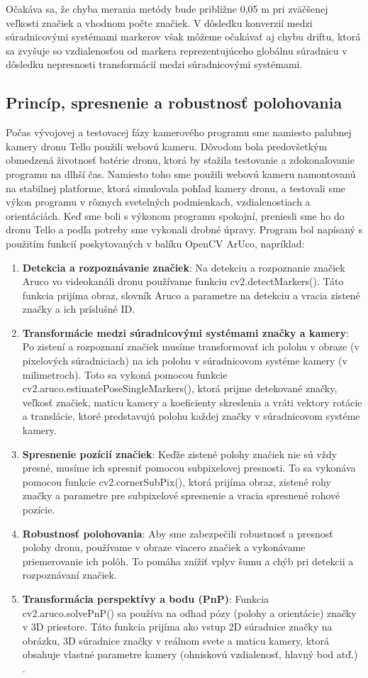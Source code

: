 {Očakáva sa, že chyba merania metódy bude približne 0,05 m pri zväčšenej veľkosti značiek a vhodnom počte značiek. V dôsledku konverzií medzi súradnicovými systémami markerov však môžeme očakávať aj chybu driftu, ktorá sa zvyšuje so vzdialenosťou od markera reprezentujúceho globálnu súradnicu v dôsledku nepresnosti transformácií medzi súradnicovými systémami.

\subsection{Princíp, spresnenie a robustnosť polohovania}
Počas vývojovej a testovacej fázy kamerového programu sme namiesto palubnej kamery dronu Tello použili webovú kameru. Dôvodom bola predovšetkým obmedzená životnosť batérie dronu, ktorá by sťažila testovanie a zdokonaľovanie programu na dlhší čas. Namiesto toho sme použili webovú kameru namontovanú na stabilnej platforme, ktorá simulovala pohľad kamery dronu, a testovali sme výkon programu v rôznych svetelných podmienkach, vzdialenostiach a orientáciách. Keď sme boli s výkonom programu spokojní, preniesli sme ho do dronu Tello a podľa potreby sme vykonali drobné úpravy.
Program bol napísaný s použitím funkcií poskytovaných v balíku OpenCV ArUco, napríklad:
\begin{enumerate}
\item \textbf{Detekcia a rozpoznávanie značiek}: Na detekciu a rozpoznanie značiek Aruco vo videokanáli dronu používame funkciu cv2.detectMarkers(). Táto funkcia prijíma obraz, slovník Aruco a parametre na detekciu a vracia zistené značky a ich príslušné ID.
\item \textbf{Transformácie medzi súradnicovými systémami značky a kamery}: Po zistení a rozpoznaní značiek musíme transformovať ich polohu v obraze (v pixelových súradniciach) na ich polohu v súradnicovom systéme kamery (v milimetroch). Toto sa vykoná pomocou funkcie cv2.aruco.estimatePoseSingleMarkers(), ktorá prijme detekované značky, veľkosť značiek, maticu kamery a koeficienty skreslenia a vráti vektory rotácie a translácie, ktoré predstavujú polohu každej značky v súradnicovom systéme kamery.
\item \textbf{Spresnenie pozícií značiek}: Keďže zistené polohy značiek nie sú vždy presné, musíme ich spresniť pomocou subpixelovej presnosti. To sa vykonáva pomocou funkcie cv2.cornerSubPix(), ktorá prijíma obraz, zistené rohy značky a parametre pre subpixelové spresnenie a vracia spresnené rohové pozície.
\item \textbf{Robustnosť polohovania}: Aby sme zabezpečili robustnosť a presnosť polohy dronu, používame v obraze viacero značiek a vykonávame priemerovanie ich polôh. To pomáha znížiť vplyv šumu a chýb pri detekcii a rozpoznávaní značiek.
\item \textbf{Transformácia perspektívy a bodu (PnP)}: Funkcia cv2.aruco.solvePnP() sa používa na odhad pózy (polohy a orientácie) značky v 3D priestore. Táto funkcia prijíma ako vstup 2D súradnice značky na obrázku, 3D súradnice značky v reálnom svete a maticu kamery, ktorá obsahuje vlastné parametre kamery (ohniskovú vzdialenosť, hlavný bod atď.) \citep{9549863}.
\end{enumerate}

}
